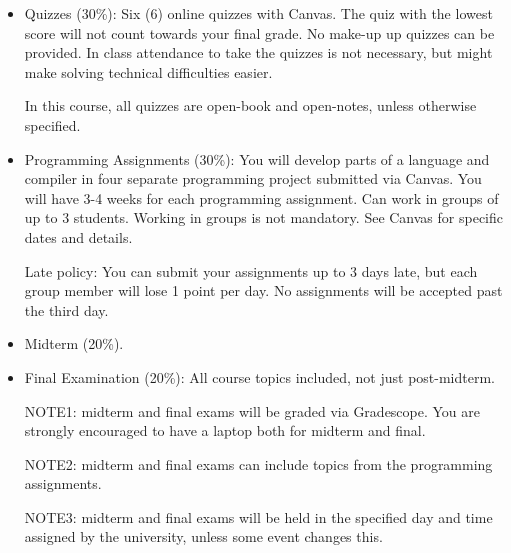 \documentclass[11pt, epsfig]{article}
\begin{document}
\begin{itemize}

\item
Quizzes (30\%): Six (6) online quizzes with Canvas. The quiz
with the lowest score will not count towards your final grade.
No make-up up quizzes can be provided. In class attendance
to take the quizzes is not necessary, but might make solving
technical difficulties easier.

In this course, all quizzes are open-book and open-notes, unless otherwise specified.  

\item
Programming Assignments (30\%): You will develop parts of a language
and compiler in four separate programming project submitted via Canvas.
You will have 3-4 weeks for each programming assignment. Can work in groups
of up to 3 students. Working in groups is not mandatory.
See Canvas for specific dates and details.

Late policy: You can submit your assignments up to 3 days late, but each 
group member will lose 1 point per day. No assignments will be accepted past the third day.

\item
Midterm (20\%).

\item
Final Examination (20\%): All course topics included, not just post-midterm.

NOTE1: midterm and final exams will be graded via Gradescope. You are strongly
encouraged to have a laptop both for midterm and final.

NOTE2: midterm and final exams can include topics from the programming assignments.

NOTE3: midterm and final exams will be held in the specified day and time assigned
by the university, unless some event changes this.

\end{itemize}


\end{document}
